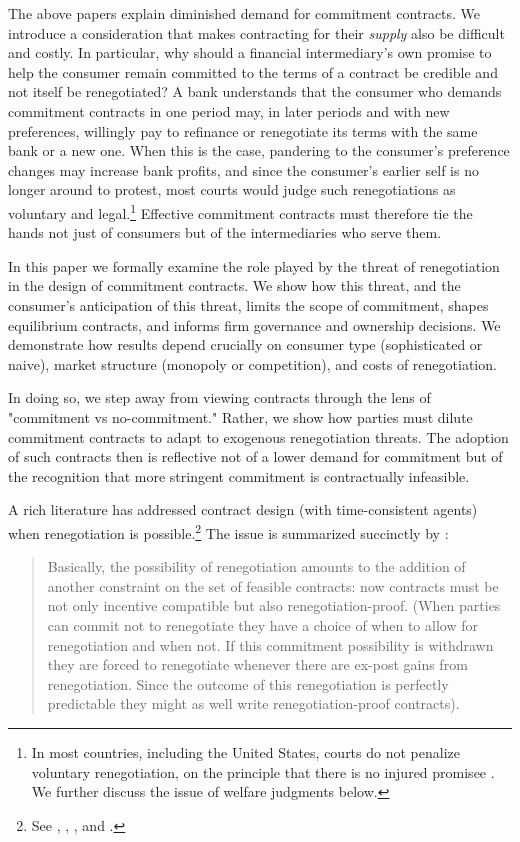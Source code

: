 \documentclass[11pt,english]{article}
\theoremstyle{plain}
\theoremstyle{definition}
\begin{document}
The above papers explain diminished demand for commitment contracts. We introduce a consideration that makes contracting for their \textit{supply} also be difficult and costly. In particular, why should a financial intermediary's own promise to help the consumer remain committed to the terms of a contract be credible and not itself be renegotiated? A bank understands that the consumer who demands commitment contracts in one period may, in later periods and with new preferences, willingly pay to refinance or renegotiate its terms \textendash{} with the same bank or a new one. When this is the case, pandering to the consumer's preference changes may increase bank profits, and since the consumer's earlier self is no longer around to protest, most courts would judge such renegotiations as voluntary and legal.\footnote{In most countries, including the United States, courts do not penalize voluntary renegotiation, on the principle that there is no injured promisee \citep[see discussion in][p448]{laibson1997}. We further discuss the issue of welfare judgments below.} Effective commitment contracts must therefore tie the hands not just of consumers but of the intermediaries who serve them.

In this paper we formally examine the role played by the threat of renegotiation in the design of commitment contracts. We show how this threat, and the consumer's anticipation of this threat, limits the scope of commitment, shapes equilibrium contracts, and informs firm governance and ownership decisions. We demonstrate how results depend crucially on consumer type (sophisticated or naive), market structure (monopoly or competition), and costs of renegotiation.

In doing so, we step away from viewing contracts through the lens of "commitment vs no-commitment." Rather, we show how parties must dilute commitment contracts to adapt to exogenous renegotiation threats. The adoption of such contracts then is reflective not of a lower demand for commitment but of the recognition that more stringent commitment is contractually infeasible.

A rich literature has addressed contract design (with time-consistent agents) when renegotiation is possible.\footnote{See \citet{hart1988}, \citet{dewatripont1989}, \citet{bolton1990}, and \citet{rubinstein1992}.} The issue is  summarized succinctly by \citet[p303]{bolton1990}:
\begin{quote}
Basically, the possibility of renegotiation amounts to the addition of another constraint on the set of feasible contracts: now contracts must be not only incentive compatible but also renegotiation-proof. (When parties can commit not to renegotiate they have a choice of when to allow for renegotiation and when not. If this commitment possibility is withdrawn they are forced to renegotiate whenever there are ex-post gains from renegotiation. Since the outcome of this renegotiation is perfectly predictable they might as well write renegotiation-proof
contracts).
\end{quote}
\end{document}
